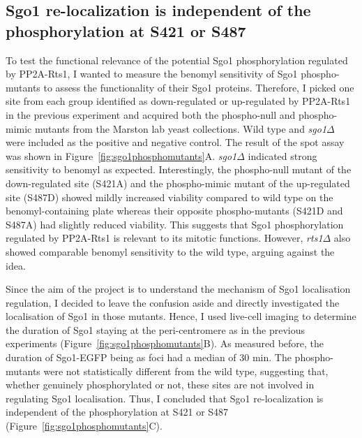 \subsection{Sgo1 re-localization is independent of the phosphorylation at S421 or S487}

To test the functional relevance of the potential Sgo1 phosphorylation regulated by PP2A-Rts1, I wanted to measure the benomyl sensitivity of Sgo1 phospho-mutants to assess the functionality of their Sgo1 proteins. Therefore, I picked one site from each group identified as down-regulated or up-regulated by PP2A-Rts1 in the previous experiment and acquired both the phospho-null and phospho-mimic mutants from the Marston lab yeast collections. Wild type and \textit{sgo1$\Delta$} were included as the positive and negative control. The result of the spot assay was shown in Figure~\ref{fig:sgo1phosphomutants}A. \textit{sgo1$\Delta$} indicated strong sensitivity to benomyl as expected. Interestingly, the phospho-null mutant of the down-regulated site (S421A) and the phospho-mimic mutant of the up-regulated site (S487D) showed mildly increased viability compared to wild type on the benomyl-containing plate whereas their opposite phospho-mutants (S421D and S487A) had slightly reduced viability. This suggests that Sgo1 phosphorylation regulated by PP2A-Rts1 is relevant to its mitotic functions. However, \textit{rts1$\Delta$} also showed comparable benomyl sensitivity to the wild type, arguing against the idea. 

Since the aim of the project is to understand the mechanism of Sgo1 localisation regulation, I decided to leave the confusion aside and directly investigated the localisation of Sgo1 in those mutants. Hence, I used live-cell imaging to determine the duration of Sgo1 staying at the peri-centromere as in the previous experiments (Figure~\ref{fig:sgo1phosphomutants}B). As measured before, the duration of Sgo1-EGFP being as foci had a median of 30 \si{\minute}. The phospho-mutants were not statistically different from the wild type, suggesting that, whether genuinely phosphorylated or not, these sites are not involved in regulating Sgo1 localisation. Thus, I concluded that Sgo1 re-localization is independent of the phosphorylation at S421 or S487 (Figure~\ref{fig:sgo1phosphomutants}C). 

